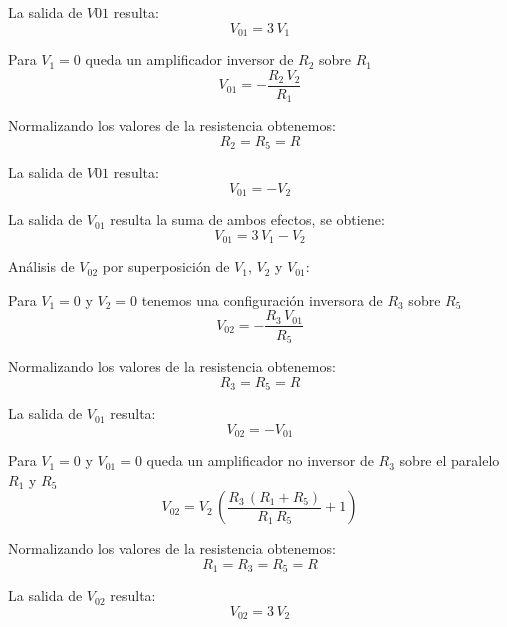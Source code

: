\documentclass[12pt]{article}
\begin{document}
		La salida de $V01$ resulta:
		\begin{equation}
			V_{01}=3\,V_1
		\end{equation}
		
		Para $V_1=0$ queda un amplificador inversor de $R_2$ sobre $R_1$ 
		\begin{equation}
			V_{01} = -\frac{R_2 \,V_2 }{R_1 }
		\end{equation}
		
		Normalizando los valores de la resistencia obtenemos:
		\begin{equation}
			R_2=R_5=R 
		\end{equation}
		
		La salida de $V01$ resulta:
		\begin{equation}
			V_{01}=-V_2
		\end{equation}
		
		La salida de $V_{01}$ resulta la suma de ambos efectos, se obtiene:
		\begin{equation}
			V_{01}=3\,V_1-V_2
		\end{equation}
		
		Análisis de $V_{02}$ por superposición de $V_1$, $V_2$ y $V_{01}$:
		
		Para $V_1=0$ y $V_2=0$  tenemos una configuración inversora de $R_3$ sobre $R_5$
		\begin{equation}
			V_{02}=-\frac{R_3 \,V_{01} }{R_5 }
		\end{equation}
		
		Normalizando los valores de la resistencia obtenemos:
		\begin{equation}
			R_3=R_5=R 
		\end{equation}
		
		La salida de $V_{01}$ resulta:
		\begin{equation}
			V_{02}=-V_{01}
		\end{equation}
		
		Para $V_1=0$ y $V_{01}=0$ queda un amplificador no inversor de $R_3$ sobre el paralelo $R_1$ y $R_5$
		\begin{equation}
			V_{02} = V_2 \,{\left(\frac{R_3 \,{\left(R_1 +R_5 \right)}}{R_1 \,R_5 }+1\right)}
		\end{equation}
		
		Normalizando los valores de la resistencia obtenemos:
		\begin{equation}
			R_1=R_3=R_5=R 
		\end{equation}
		
		La salida de $V_{02}$ resulta:
		\begin{equation}
			V_{02}=3\,V_2
		\end{equation}
		
\end{document}
